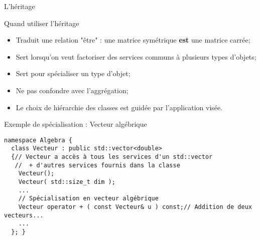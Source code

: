 \documentclass[compress,10pt,aspectratio=169]{beamer}
\begin{document}
\begin{frame}[fragile]{L'héritage}
  \scriptsize\vspace*{-4mm}
  \begin{block}{\small Quand utiliser l'héritage}
  \begin{itemize}
  \item Traduit une relation "être" : une matrice symétrique \textbf{est} une matrice carrée;
  \item Sert lorsqu'on veut factoriser des services communs à plusieurs types d'objets;
  \item Sert pour spécialiser un type d'objet;
  \item Ne pas confondre avec l'aggrégation;
  \item Le choix de hiérarchie des classes est guidée par l'application visée.
  \end{itemize}
  \end{block}
  \vspace*{-4mm}
  \begin{exampleblock}{\small Exemple de spécialisation : Vecteur algébrique}
  \vspace*{-2mm}
    \begin{verbatim}
namespace Algebra {
  class Vecteur : public std::vector<double>
  {// Vecteur a accès à tous les services d'un std::vector
   //  + d'autres services fournis dans la classe
    Vecteur();
    Vecteur( std::size_t dim );
    ...
    // Spécialisation en vecteur algébrique
    Vecteur operator + ( const Vecteur& u ) const;// Addition de deux vecteurs...
    ...
  }; }
  \end{verbatim}
  \end{exampleblock}
  \end{frame}
  
\end{document}
